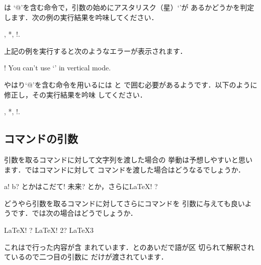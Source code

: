 \begin{Exe}
は `\str @'を含む命令で，引数の始めにアスタリスク（星）`\str{*}'が
あるかどうかを判定します．次の例の実行結果を吟味してください．

\begin{InTeX}
\newcommand\checkstar{}
\checkstar, \checkstar*, \checkstar!.
\end{InTeX}

上記の例を実行すると次のようなエラーが表示されます．

\begin{OutTerm}
! You can't use `\spacefactor' in vertical mode.
\end{OutTerm}
%


やはり`\str @'を含む命令を用いるには  と 
で囲む必要があるようです．以下のように修正し，その実行結果を吟味
してください．

\begin{InTeX}
\makeatletter
\newcommand\checkstar{}
\checkstar, \checkstar*, \checkstar!.
\makeatother
\end{InTeX}
\end{Exe}

\subsection{コマンドの引数}
引数を取るコマンドに対して文字列を渡した場合の
挙動は予想しやすいと思います．ではコマンドに対して
コマンドを渡した場合はどうなるでしょうか．
\begin{InOut}
\newcommand{\twoarg}[2]{#1! #2? }
\twoarg a bとか\twoarg{はこだて}
{未来}とか，さらに\twoarg{\LaTeX}
{\LaTeXe}
\end{InOut}
どうやら引数を取るコマンドに対してさらにコマンドを
引数に与えても良いようです．では次の場合はどうでしょうか．
\begin{InOut}
\newcommand{\twoarg}[2]{#1! #2? }
\twoarg\LaTeX\LaTeXe 
\twoarg\LaTeX2\LaTeX3
\end{InOut}
これはで行った内容が含
まれています．\qu{\LaTeX}とのあいだで語が区
切られて解釈されているので二つ目の引数に
だけが渡されています．

